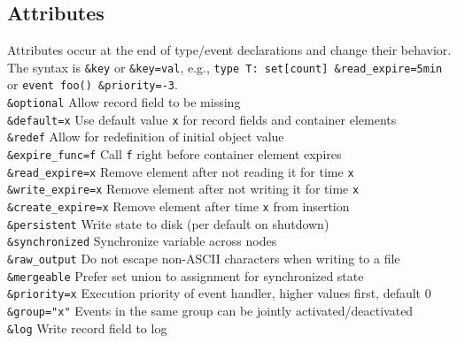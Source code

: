 \documentclass[10pt,landscape]{article}
\begin{document}
\begin{multicols*}{2}
\subsection*{Attributes}
Attributes occur at the end of type/event declarations and change their
behavior. The syntax is \verb|&key| or \verb|&key=val|, e.g.,
\verb|type T: set[count] &read_expire=5min| or
\verb|event foo() &priority=-3|.\\

\verb|&optional| \dotfill Allow record field to be missing\\
\verb|&default=x| \dotfill Use default value \texttt{x} for record fields and
  container elements\\
\verb|&redef| \dotfill Allow for redefinition of initial object value\\
%
\verb|&expire_func=f| \dotfill Call \verb|f| right before container element
  expires\\
\verb|&read_expire=x| \dotfill Remove element after not reading it for time
  \verb|x|\\
\verb|&write_expire=x| \dotfill Remove element after not writing it for time
  \verb|x|\\
\verb|&create_expire=x| \dotfill Remove element after time \verb|x| from
  insertion\\
\verb|&persistent| \dotfill Write state to disk (per default on shutdown)\\
\verb|&synchronized| \dotfill Synchronize variable across nodes\\
\verb|&raw_output| \dotfill Do not escape non-ASCII characters when writing to
  a file\\
\verb|&mergeable| \dotfill Prefer set union to assignment for synchronized
  state\\
\verb|&priority=x| \dotfill Execution priority of event handler, higher values
first, default 0\\
\verb|&group="x"| \dotfill Events in the same group can be jointly
  activated/deactivated\\
\verb|&log| \dotfill Write record field to log \\


\end{multicols*}
\end{document}
